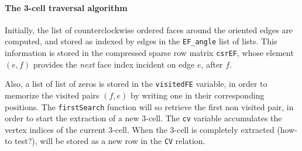 \documentclass[11pt,oneside]{article}    %
\begin{document}
\paragraph{The 3-cell traversal algorithm}
Initially, the list of counterclockwise ordered faces around the oriented edges are computed, and stored as indexed by edges in the \texttt{EF\_angle} list of lists. This information is stored in the compressed sparse row matrix \texttt{csrEF}, whose element $(e,f)$ provides the \emph{next} face index  incident on edge $e$, after $f$. 

Also, a list of list of zeros is stored in the \texttt{visitedFE} variable, in order to memorize the visited pairs $(f,e)$ by writing one in their corresponding positions. The \texttt{firstSearch} function will so retrieve the first non visited pair, in order to start the extraction of a new 3-cell. The \texttt{cv} variable accumulates the vertex indices of the current 3-cell. When the 3-cell is completely extracted (how-to test?), will be stored as a new row in the \texttt{CV} relation. 
\end{document}
